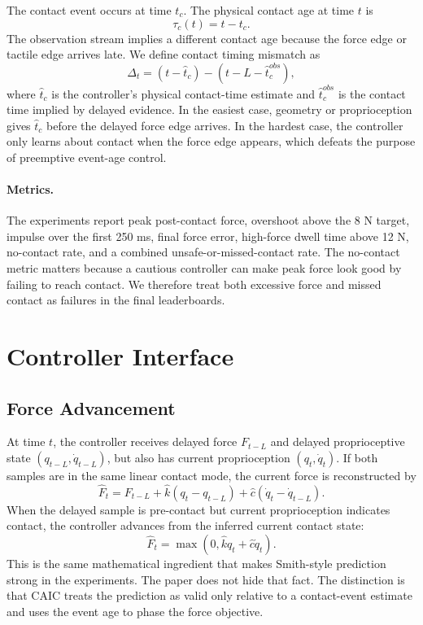 \documentclass{article}
\newcommand{\lat}{L}
\newcommand{\force}{F}
\newcommand{\qpos}{q}
\newcommand{\qvel}{\dot q}
\newcommand{\ctm}{\Delta}
\newcommand{\caic}{CAIC}
\begin{document}
The contact event occurs at time $t_c$. The physical contact age at time $t$ is
\begin{equation}
    \tau_c(t) = t - t_c.
\end{equation}
The observation stream implies a different contact age because the force edge or tactile edge arrives late. We define contact timing mismatch as
\begin{equation}
    \ctm_t =
    (t-\hat t_c) -
    (t-\lat-\hat t_c^{obs}),
\end{equation}
where $\hat t_c$ is the controller's physical contact-time estimate and $\hat t_c^{obs}$ is the contact time implied by delayed evidence. In the easiest case, geometry or proprioception gives $\hat t_c$ before the delayed force edge arrives. In the hardest case, the controller only learns about contact when the force edge appears, which defeats the purpose of preemptive event-age control.

\paragraph{Metrics.}
The experiments report peak post-contact force, overshoot above the 8 N target, impulse over the first 250 ms, final force error, high-force dwell time above 12 N, no-contact rate, and a combined unsafe-or-missed-contact rate. The no-contact metric matters because a cautious controller can make peak force look good by failing to reach contact. We therefore treat both excessive force and missed contact as failures in the final leaderboards.

\section{Controller Interface}

\subsection{Force Advancement}

At time $t$, the controller receives delayed force $\force_{t-\lat}$ and delayed proprioceptive state $(\qpos_{t-\lat},\qvel_{t-\lat})$, but also has current proprioception $(\qpos_t,\qvel_t)$. If both samples are in the same linear contact mode, the current force is reconstructed by
\begin{equation}
    \hat \force_t =
    \force_{t-\lat}
    + \hat k(\qpos_t-\qpos_{t-\lat})
    + \hat c(\qvel_t-\qvel_{t-\lat}).
    \label{eq:advance}
\end{equation}
When the delayed sample is pre-contact but current proprioception indicates contact, the controller advances from the inferred current contact state:
\begin{equation}
    \hat \force_t = \max(0,\hat k \qpos_t+\hat c \qvel_t).
\end{equation}
This is the same mathematical ingredient that makes Smith-style prediction strong in the experiments. The paper does not hide that fact. The distinction is that \caic{} treats the prediction as valid only relative to a contact-event estimate and uses the event age to phase the force objective.
\end{document}

